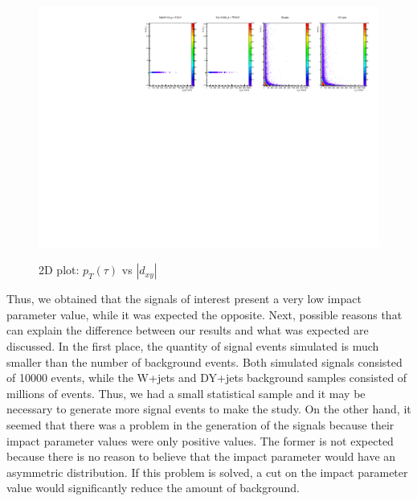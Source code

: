  \begin{figure}[h] 
 \centering
 \caption{2D plot: $p_T(\tau)$ vs $|d_{xy}|$}
 \includegraphics[width=1.15\textwidth]{./Capitulos/Analysis/ipt1_pt} 
 \label{ipt1_pt}
 \end{figure}
 
 
Thus, we obtained that the signals of interest present a very low impact parameter value, while it was expected the opposite. Next, possible reasons that can explain the difference between our results and what was expected are discussed. In the first place, the quantity of signal events simulated is much smaller than the number of background events. Both simulated signals consisted of 10000 events, while the W+jets and DY+jets background samples consisted of millions of events. Thus, we had a small statistical sample and it may be necessary to generate more signal events to make the study. On the other hand, it seemed that there was a problem in the generation of the signals because their impact parameter values were only positive values. The former is not expected because there is no reason to believe that the impact parameter would have an asymmetric distribution. If this problem is solved, a cut on the impact parameter value would significantly reduce the amount of background.
